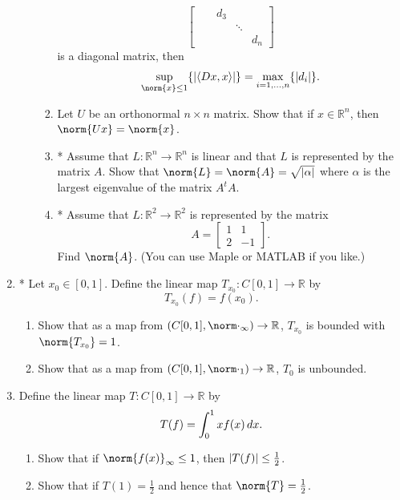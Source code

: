 \documentclass[notoc,notitlepage]{tufte-book}
\begin{document}
\begin{enumerate}
\begin{enumerate}
\begin{enumerate}
\begin{equation*}
\begin{bmatrix}
                     &     & d_3 &        & \\
                     &     &     & \ddots & \\
                     &     &     &        & d_n
              \end{bmatrix}
            \end{equation*}
            is a diagonal matrix, then
            \begin{equation*}
              \sup_{\norm{x} \leq 1} \{ \abs{ \langle Dx, x \rangle } \} = \max_{i = 1, \ldots, n} \{ \abs{ d_i } \}.
            \end{equation*}
          \item Let $U$ be an orthonormal $n \times n$ matrix. Show that if $x \in \mathbb{R}^n$, then $\norm{ Ux } = \norm{x}$.
          \item * Assume that $L : \mathbb{R}^n \to \mathbb{R}^n$ is linear and that $L$ is represented by the matrix $A$. Show that $\norm{L} = \norm{A} = \sqrt{\abs{\alpha}}$ where $\alpha$ is the largest eigenvalue of the matrix $A^t A$.
          \item * Assume that $L : \mathbb{R}^2 \to \mathbb{R}^2$ is represented by the matrix
            \begin{equation*}
              A = \begin{bmatrix}
                1 & 1 \\
                2 & -1
              \end{bmatrix}.
            \end{equation*}
            Find $\norm{A}$. (You can use Maple or MATLAB if you like.)
        \end{enumerate}
    \end{enumerate}

  \item * Let $x_0 \in [0, 1]$. Define the linear map $T_{x_0} : C[0, 1] \to \mathbb{R}$ by
    \begin{equation*}
      T_{x_0}(f) = f(x_0).
    \end{equation*}
    \begin{enumerate}
      \item Show that as a map from $(C[0, 1], \norm\cdot_\infty) \to \mathbb{R}$, $T_{x_0}$ is bounded with $\norm{ T_{x_0} } = 1$.
      \item Show that as a map from $(C[0, 1], \norm\cdot_1) \to \mathbb{R}$, $T_0$ is unbounded.
    \end{enumerate}

  \item Define the linear map $T : C[ 0, 1 ] \to \mathbb{R}$ by
    \begin{equation*}
      T(f) = \int_{0}^{1} xf(x) \mathop{}\!d{x}.
    \end{equation*}
    \begin{enumerate}
      \item Show that if $\norm{ f(x) }_\infty \leq 1$, then $\left| T(f) \right| \leq \frac{1}{2}$.
      \item Show that if $T(1) = \frac{1}{2}$ and hence that $\norm{T} = \frac{1}{2}$.
    \end{enumerate}


\end{enumerate}
\end{document}

